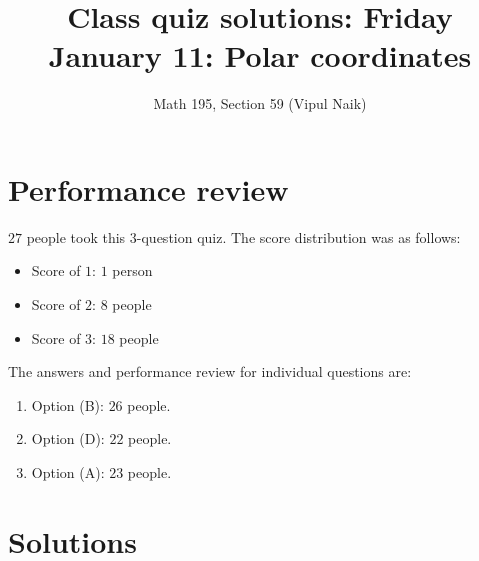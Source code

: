 \documentclass[10pt]{amsart}
\title{Class quiz solutions: Friday January 11: Polar coordinates}
\author{Math 195, Section 59 (Vipul Naik)}
\begin{document}
\maketitle

\section{Performance review}

$27$ people took this $3$-question quiz. The score distribution was as
follows:

\begin{itemize}
\item Score of $1$: $1$ person
\item Score of $2$: $8$ people
\item Score of $3$: $18$ people
\end{itemize}

The answers and performance review for individual questions are:

\begin{enumerate}
\item Option (B): $26$ people.
\item Option (D): $22$ people.
\item Option (A): $23$ people.
\end{enumerate}

\section{Solutions}
\end{document}
